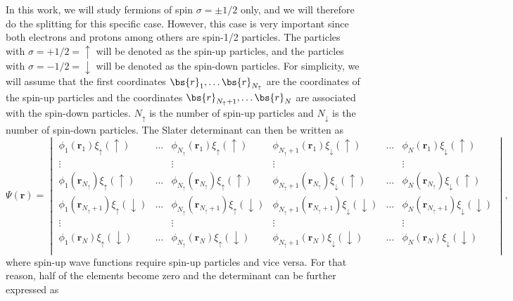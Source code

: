 In this work, we will study fermions of spin $\sigma=\pm 1/2$ only, and we will therefore do the splitting for this specific case. However, this case is very important since both electrons and protons among others are spin-1/2 particles. The particles with $\sigma=+1/2=\uparrow$ will be denoted as the spin-up particles, and the particles with $\sigma=-1/2=\downarrow$ will be denoted as the spin-down particles. For simplicity, we will assume that the first coordinates $\bs{r}_1,\hdots\bs{r}_{N_{\uparrow}}$ are the coordinates of the spin-up particles and the coordinates $\bs{r}_{N_{\uparrow}+1},\hdots\bs{r}_N$ are associated with the spin-down particles. $N_{\uparrow}$ is the number of spin-up particles and $N_{\downarrow}$ is the number of spin-down particles. The Slater determinant can then be written as
\begin{equation*}
\Psi(\boldsymbol{r})=
\begin{vmatrix}
\phi_1(\boldsymbol{r}_1)\xi_{\uparrow}(\uparrow) & \hdots & \phi_{N_{\uparrow}}(\boldsymbol{r}_1)\xi_{\uparrow}(\uparrow) & \phi_{N_{\uparrow}+1}(\boldsymbol{r}_1)\xi_{\downarrow}(\uparrow) & \hdots & \phi_{N}(\boldsymbol{r}_1)\xi_{\downarrow}(\uparrow)\\
\vdots & & \vdots & \vdots & & \vdots \\
\phi_1(\boldsymbol{r}_{N_{\uparrow}})\xi_{\uparrow}(\uparrow) & \hdots & \phi_{N_{\uparrow}}(\boldsymbol{r}_{N_{\uparrow}})\xi_{\uparrow}(\uparrow) & \phi_{N_{\uparrow}+1}(\boldsymbol{r}_{N_{\uparrow}})\xi_{\downarrow}(\uparrow) & \hdots & \phi_{N}(\boldsymbol{r}_{N_{\uparrow}})\xi_{\downarrow}(\uparrow)\\
\phi_1(\boldsymbol{r}_{N_{\uparrow}+1})\xi_{\uparrow}(\downarrow) & \hdots & \phi_{N_{\uparrow}}(\boldsymbol{r}_{N_{\uparrow}+1})\xi_{\uparrow}(\downarrow) & \phi_{N_{\uparrow}+1}(\boldsymbol{r}_{N_{\uparrow}+1})\xi_{\downarrow}(\downarrow) & \hdots & \phi_{N}(\boldsymbol{r}_{N_{\uparrow}+1})\xi_{\downarrow}(\downarrow)\\
\vdots & & \vdots & \vdots & & \vdots \\
\phi_1(\boldsymbol{r}_N)\xi_{\uparrow}(\downarrow) & \hdots & \phi_{N_{\uparrow}}(\boldsymbol{r}_N)\xi_{\uparrow}(\downarrow) & \phi_{N_{\uparrow}+1}(\boldsymbol{r}_N)\xi_{\downarrow}(\downarrow) & \hdots & \phi_{N}(\boldsymbol{r}_N)\xi_{\downarrow}(\downarrow)\\
\end{vmatrix},
\end{equation*}
where spin-up wave functions require spin-up particles and vice versa. For that reason, half of the elements become zero and the determinant can be further expressed as
